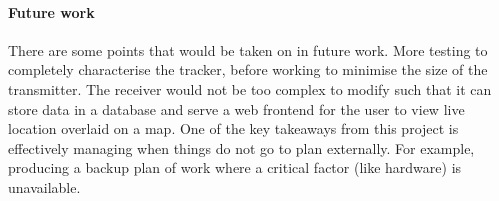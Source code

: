 \documentclass[11pt]{article}
\begin{document}
\paragraph{Future work}
There are some points that would be taken on in future work. More testing to completely characterise the tracker,
before working to minimise the size of the transmitter. The receiver would not be too complex to modify such that 
it can store data in a database and serve a web frontend for the user to view live location overlaid on a map. 
One of the key takeaways from this project is effectively managing when things do not go to plan externally. 
For example, producing a backup plan of work where a critical factor (like hardware) is unavailable.
\end{document}

